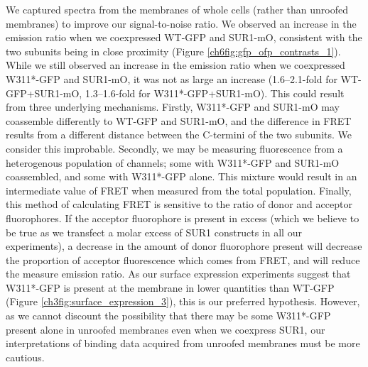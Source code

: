 We captured spectra from the membranes of whole cells (rather than unroofed membranes) to improve our signal-to-noise ratio.
We observed an increase in the emission ratio when we coexpressed WT-GFP and SUR1-mO, consistent with the two subunits being in close proximity (Figure \ref{ch6fig:gfp_ofp_contrasts_1}).
While we still observed an increase in the emission ratio when we coexpressed W311*-GFP and SUR1-mO, it was not as large an increase (\numrange{1.6}{2.1}-fold for WT-GFP+SUR1-mO, \numrange{1.3}{1.6}-fold for W311*-GFP+SUR1-mO).
This could result from three underlying mechanisms.
Firstly, W311*-GFP and SUR1-mO may coassemble differently to WT-GFP and SUR1-mO, and the difference in FRET results from a different distance between the C-termini of the two subunits.
We consider this improbable.
Secondly, we may be measuring fluorescence from a heterogenous population of channels; some with W311*-GFP and SUR1-mO coassembled, and some with W311*-GFP alone.
This mixture would result in an intermediate value of FRET when measured from the total population.
Finally, this method of calculating FRET is sensitive to the ratio of donor and acceptor fluorophores.
If the acceptor fluorophore is present in excess (which we believe to be true as we transfect a molar excess of SUR1 constructs in all our experiments), a decrease in the amount of donor fluorophore present will decrease the proportion of acceptor fluorescence which comes from FRET, and will reduce the measure emission ratio.
As our surface expression experiments suggest that W311*-GFP is present at the membrane in lower quantities than WT-GFP (Figure \ref{ch3fig:surface_expression_3}), this is our preferred hypothesis.
However, as we cannot discount the possibility that there may be some W311*-GFP present alone in unroofed membranes even when we coexpress SUR1, our interpretations of binding data acquired from unroofed membranes must be more cautious.

